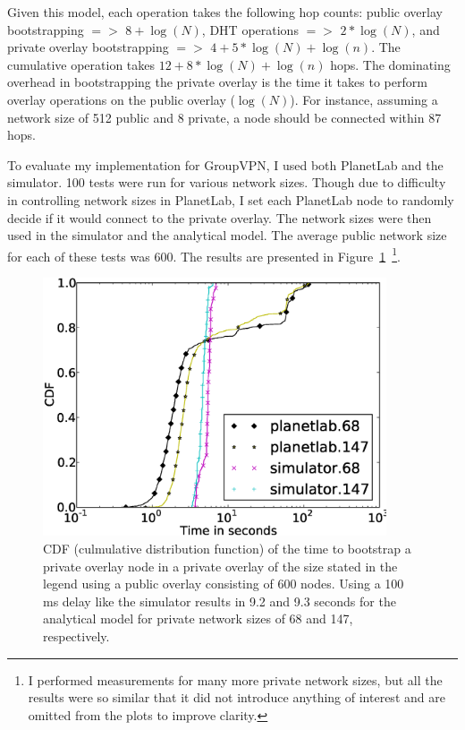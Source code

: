 Given this model, each operation takes the following hop counts: public overlay
bootstrapping $=>$ $8 + \log(N)$, DHT operations $=>$ $2 * \log(N)$, and
private overlay bootstrapping $=>$ $4 + 5 * \log(N) + \log(n)$.  The cumulative
operation takes $12 + 8 * \log(N) + \log(n)$ hops.  The dominating overhead in
bootstrapping the private overlay is the time it takes to perform overlay
operations on the public overlay ($\log(N)$).  For instance, assuming a network
size of 512 public and 8 private, a node should be connected within 87 hops.

To evaluate my implementation for GroupVPN, I used both PlanetLab and the
simulator.  100 tests were run for various network sizes.  Though due to
difficulty in controlling network sizes in PlanetLab, I set each PlanetLab node
to randomly decide if it would connect to the private overlay.  The network
sizes were then used in the simulator and the analytical model.  The average
public network size for each of these tests was 600.  The results are presented
in Figure~\ref{fig:private_bootstrapping}~\footnote{I performed measurements
for many more private network sizes, but all the results were so similar that
it did not introduce anything of interest and are omitted from the  plots to
improve clarity.}.

\begin{figure}[ht]
\centering
\includegraphics[width=4in]{figs/private.eps}
\caption[CDF of private overlay bootstrap time]{CDF (culmulative distribution
function) of the time to bootstrap a private overlay node in a private overlay
of the size stated in the legend using a public overlay consisting of 600
nodes.  Using a 100 ms delay like the simulator results in 9.2 and 9.3 seconds
for the analytical model for private network sizes of 68 and 147,
respectively.}
\label{fig:private_bootstrapping}
\end{figure}

